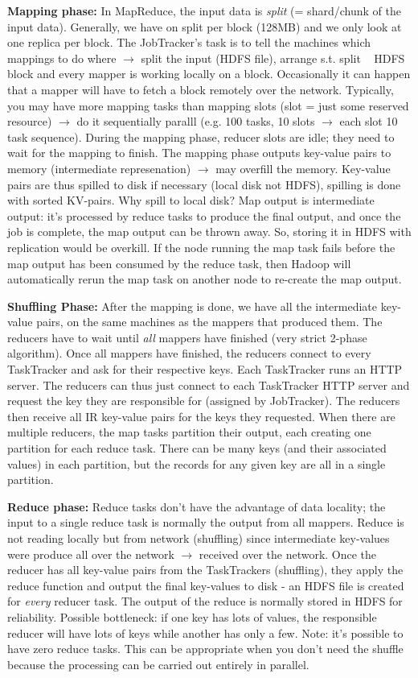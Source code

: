 \documentclass[11pt,oneside,a4paper]{article}
\begin{document}
\textbf{Mapping phase:} In MapReduce, the input data is \textit{split} (= shard/chunk of the input data). Generally, we have on split per block (128MB) and we only look at one replica per block. The JobTracker's task is to tell the machines which mappings to do where $\rightarrow$ split the input (HDFS file), arrange s.t. split ~ HDFS block and every mapper is working locally on a block. Occasionally it can happen that a mapper will have to fetch a block remotely over the network. Typically, you may have more mapping tasks than mapping slots (slot = just some reserved resource) $\rightarrow$ do it sequentially paralll (e.g. 100 tasks, 10 slots $\rightarrow$ each slot 10 task sequence). During the mapping phase, reducer slots are idle; they need to wait for the mapping to finish. The mapping phase outputs key-value pairs to memory (intermediate represenation) $\rightarrow$ may overfill the memory. Key-value pairs are thus spilled to disk if necessary (local disk not HDFS), spilling is done with sorted KV-pairs. Why spill to local disk? Map output is intermediate output: it’s processed by reduce tasks to produce the final output, and once the job is complete, the map output can be thrown away. So, storing it in HDFS with replication would be overkill. If the node running the map task fails before the map output has been consumed by the reduce task, then Hadoop will automatically rerun the map task on another node to re-create the map output.

\textbf{Shuffling Phase:} After the mapping is done, we have all the intermediate key-value pairs, on the same machines as the mappers that produced them. The reducers have to wait until \textit{all} mappers have finished (very strict 2-phase algorithm). Once all mappers have finished, the reducers connect to every TaskTracker and ask for their respective keys. Each TaskTracker runs an HTTP server. The reducers can thus just connect to each TaskTracker HTTP server and request the key they are responsible for (assigned by JobTracker). The reducers then receive all IR key-value pairs for the keys they requested. When there are multiple reducers, the map tasks partition their output, each creating one partition for each reduce task. There can be many keys (and their associated values) in each partition, but the records for any given key are all in a single partition.

\textbf{Reduce phase:} Reduce tasks don’t have the advantage of data locality; the input to a single reduce task is normally the output from all mappers. Reduce is not reading locally but from network (shuffling) since intermediate key-values were produce all over the network $\rightarrow$ received over the network. Once the reducer has all key-value pairs from the TaskTrackers (shuffling), they apply the reduce function and output the final key-values to disk - an HDFS file is created for \textit{every} reducer task. The output of the reduce is normally stored in HDFS for reliability. Possible bottleneck: if one key has lots of values, the responsible reducer will have lots of keys while another has only a few. Note: it’s possible to have zero reduce tasks. This can be appropriate when you don’t need the shuffle because the processing can be carried out entirely in parallel.
\end{document}
